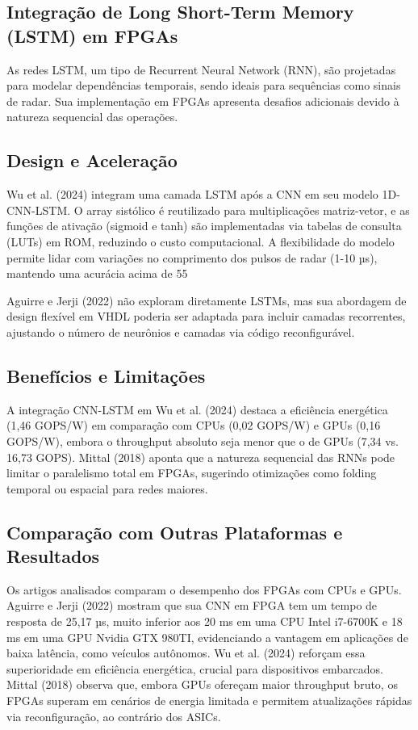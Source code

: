 \subsection{Integração de Long Short-Term Memory (LSTM) em FPGAs}
As redes LSTM, um tipo de Recurrent Neural Network (RNN), são projetadas para modelar dependências temporais, sendo ideais para sequências como sinais de radar. Sua implementação em FPGAs apresenta desafios adicionais devido à natureza sequencial das operações.

\subsection{Design e Aceleração}
Wu et al. (2024) integram uma camada LSTM após a CNN em seu modelo 1D-CNN-LSTM. O array sistólico é reutilizado para multiplicações matriz-vetor, e as funções de ativação (sigmoid e tanh) são implementadas via tabelas de consulta (LUTs) em ROM, reduzindo o custo computacional. A flexibilidade do modelo permite lidar com variações no comprimento dos pulsos de radar (1-10 µs), mantendo uma acurácia acima de 55%

Aguirre e Jerji (2022) não exploram diretamente LSTMs, mas sua abordagem de design flexível em VHDL poderia ser adaptada para incluir camadas recorrentes, ajustando o número de neurônios e camadas via código reconfigurável.

\subsection{Benefícios e Limitações}
A integração CNN-LSTM em Wu et al. (2024) destaca a eficiência energética (1,46 GOPS/W) em comparação com CPUs (0,02 GOPS/W) e GPUs (0,16 GOPS/W), embora o throughput absoluto seja menor que o de GPUs (7,34 vs. 16,73 GOPS). Mittal (2018) aponta que a natureza sequencial das RNNs pode limitar o paralelismo total em FPGAs, sugerindo otimizações como folding temporal ou espacial para redes maiores.

\subsection{Comparação com Outras Plataformas e Resultados}
Os artigos analisados comparam o desempenho dos FPGAs com CPUs e GPUs. Aguirre e Jerji (2022) mostram que sua CNN em FPGA tem um tempo de resposta de 25,17 µs, muito inferior aos 20 ms em uma CPU Intel i7-6700K e 18 ms em uma GPU Nvidia GTX 980TI, evidenciando a vantagem em aplicações de baixa latência, como veículos autônomos. Wu et al. (2024) reforçam essa superioridade em eficiência energética, crucial para dispositivos embarcados. Mittal (2018) observa que, embora GPUs ofereçam maior throughput bruto, os FPGAs superam em cenários de energia limitada e permitem atualizações rápidas via reconfiguração, ao contrário dos ASICs.

